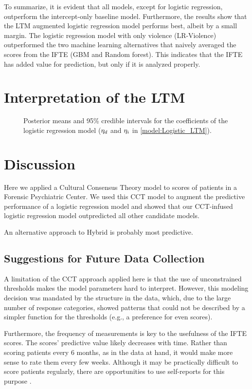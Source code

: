 \documentclass[a4paper,11pt]{article}
\begin{document}
To summarize, it is evident that all models, except for logistic regression, outperform the intercept-only baseline model.
Furthermore, the results show that the LTM augmented logistic regression model performs best, albeit by a small margin.
The logistic regression model with only violence (LR-Violence) outperformed the two machine learning alternatives that naively averaged the scores from the IFTE (GBM and Random forest).
This indicates that the IFTE has added value for prediction, but only if it is analyzed properly.

\section{Interpretation of the LTM}

\begin{figure}
    \centering
    
    \caption{Posterior means and 95\% credible intervals for the coefficients of the logistic regression model ($\eta_{d}$ and $\eta_{i}$ in \autoref{model:Logistic_LTM}).}
    \label{fig:my_label}
\end{figure}

\section{Discussion}
Here we applied a Cultural Consensus Theory model to scores of patients in a Forensic Psychiatric Center.
We used this CCT model to augment the predictive performance of a logistic regression model and showed that our CCT-infused logistic regression model outpredicted all other candidate models.

An alternative approach to 
Hybrid is probably most predictive.

\subsection{Suggestions for Future Data Collection}
A limitation of the CCT approach applied here is that the use of unconstrained thresholds makes the model parameters hard to interpret.
However, this modeling decision was mandated by the structure in the data, which, due to the large number of response categories, showed patterns that could not be described by a simpler function for the thresholds (e.g., a preference for even scores).

Furthermore, the frequency of measurements is key to the usefulness of the IFTE scores.
The scores' predictive value likely decreases with time.
Rather than scoring patients every 6 months, as in the data at hand, it would make more sense to rate them every few weeks.
Although it may be practically difficult to score patients regularly, there are opportunities to use self-reports for this purpose \parencite{tuente2021mapping, bousardt2016predicting}.
\end{document}
